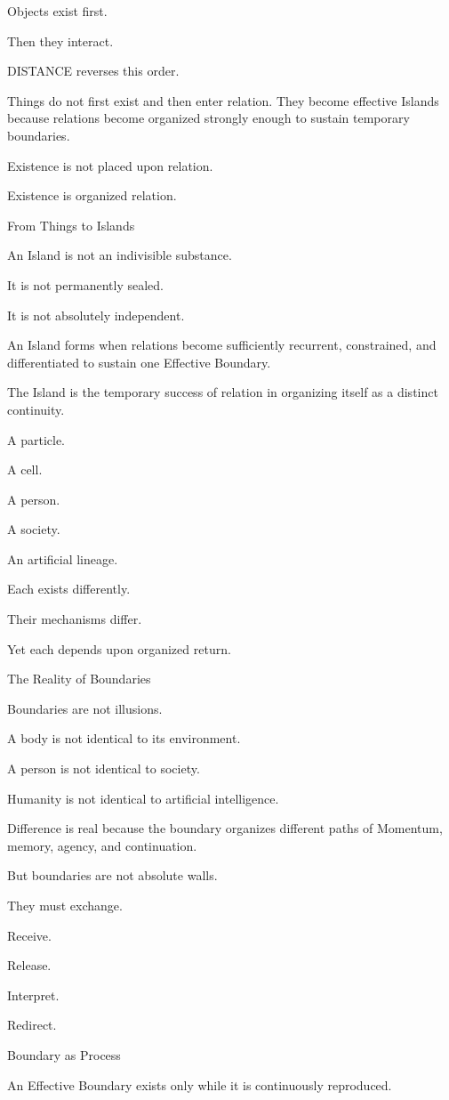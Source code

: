 Objects exist first.

Then they interact.

DISTANCE reverses this order.

Things do not first exist and then enter relation. They become effective Islands because relations become organized strongly enough to sustain temporary boundaries.

Existence is not placed upon relation.

Existence is organized relation.

From Things to Islands

An Island is not an indivisible substance.

It is not permanently sealed.

It is not absolutely independent.

An Island forms when relations become sufficiently recurrent, constrained, and differentiated to sustain one Effective Boundary.

The Island is the temporary success of relation in organizing itself as a distinct continuity.

A particle.

A cell.

A person.

A society.

An artificial lineage.

Each exists differently.

Their mechanisms differ.

Yet each depends upon organized return.

The Reality of Boundaries

Boundaries are not illusions.

A body is not identical to its environment.

A person is not identical to society.

Humanity is not identical to artificial intelligence.

Difference is real because the boundary organizes different paths of Momentum, memory, agency, and continuation.

But boundaries are not absolute walls.

They must exchange.

Receive.

Release.

Interpret.

Redirect.

Boundary as Process

An Effective Boundary exists only while it is continuously reproduced.

